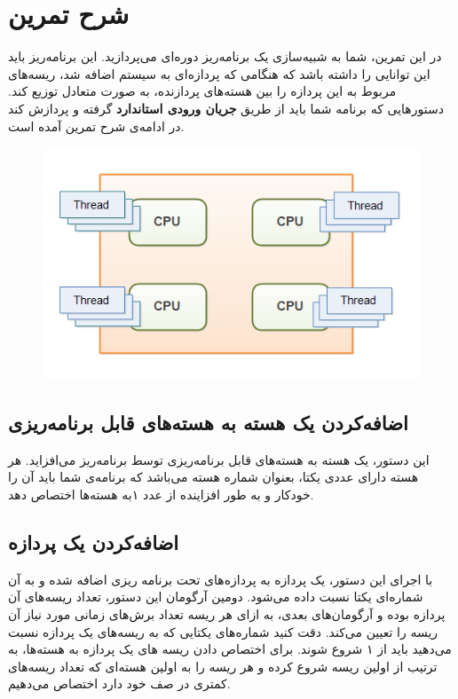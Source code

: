 \documentclass{utap}
\begin{document}
	\section{شرح تمرین}
	\hspace{5mm}
	در این تمرین، شما به شبیه‌سازی یک برنامه‌ریز دوره‌ای می‌پردازید. این برنامه‌ریز باید این توانایی را داشته باشد که هنگامی که پردازه‌ای به سیستم اضافه شد، ریسه‌های مربوط به این پردازه را بین هسته‌های پردازنده، به صورت متعادل توزیع کند. دستورهایی که برنامه شما باید از طریق \textbf{جریان ورودی استاندارد} گرفته و پردازش کند در ادامه‌ی شرح تمرین آمده است.
	
	\begin{figure}[H]
		\centering
		\includegraphics[width=0.5 \textwidth]{ThreadsOnCore.png}     
	\end{figure}
	
	
	\subsection{اضافه‌کردن یک هسته به هسته‌های قابل برنامه‌ریزی}
	\hspace{5mm}
	این دستور، یک هسته به هسته‌های قابل برنامه‌ریزی توسط برنامه‌ریز می‌افزاید. هر هسته دارای عددی یکتا، بعنوان شماره هسته می‌باشد که برنامه‌ی شما باید آن را خودکار و به طور افزاینده از عدد ۱به هسته‌ها اختصاص دهد.

	 \linespread{1.6}
	\begin{latin}%
		\centering
		\begin{minipage}[t]{1\textwidth}
			{}
			{}
		\end{minipage}%
	\end{latin}
	
	\subsection{اضافه‌کردن یک پردازه}
	\hspace{5mm}
	با اجرای این دستور، یک پردازه به پردازه‌های تحت برنامه ریزی اضافه‌ شده و به آن شماره‌ا‌‌ی یکتا نسبت داده می‌شود. دومین آرگومان این دستور، تعداد ریسه‌های آن پردازه بوده و آرگومان‌‌های بعدی، به ازای هر ریسه تعداد برش‌های زمانی مورد نیاز آن ریسه را تعیین می‌کند. دقت کنید شماره‌‌ها‌ی یکتایی که به ریسه‌های یک پردازه نسبت می‌دهید باید از ۱ شروع شوند. برای اختصاص دادن ریسه ‌های یک پردازه به هسته‌ها، به ترتیب از اولین ریسه شروع کرده و هر ریسه را به اولین هسته‌ای  که تعداد ریسه‌های کمتری در صف خود دارد اختصاص می‌دهیم.
	
\end{document}
